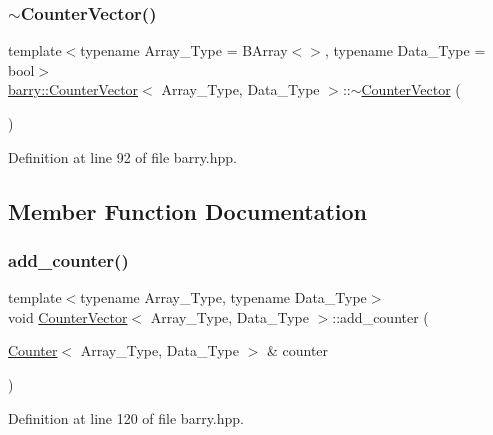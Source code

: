 \subsubsection{\texorpdfstring{$\sim$\+Counter\+Vector()}{~CounterVector()}}
{\footnotesize\ttfamily template$<$typename Array\+\_\+\+Type = B\+Array$<$$>$, typename Data\+\_\+\+Type = bool$>$ \\
\hyperlink{classbarry_1_1_counter_vector}{barry\+::\+Counter\+Vector}$<$ Array\+\_\+\+Type, Data\+\_\+\+Type $>$\+::$\sim$\hyperlink{classbarry_1_1_counter_vector}{Counter\+Vector} (\begin{DoxyParamCaption}{ }\end{DoxyParamCaption})\hspace{0.3cm}{\ttfamily [inline]}}



Definition at line 92 of file barry.\+hpp.



\subsection{Member Function Documentation}
\mbox{\label{classbarry_1_1_counter_vector_a34fda06ff678691daf3b0455c1a2af48}} 
\subsubsection{\texorpdfstring{add\+\_\+counter()}{add\_counter()}\hspace{0.1cm}{\footnotesize\ttfamily [1/3]}}
{\footnotesize\ttfamily template$<$typename Array\+\_\+\+Type, typename Data\+\_\+\+Type$>$ \\
void \hyperlink{classbarry_1_1_counter_vector}{Counter\+Vector}$<$ Array\+\_\+\+Type, Data\+\_\+\+Type $>$\+::add\+\_\+counter (\begin{DoxyParamCaption}\item[{\hyperlink{classbarry_1_1_counter}{Counter}$<$ Array\+\_\+\+Type, Data\+\_\+\+Type $>$ \&}]{counter }\end{DoxyParamCaption})\hspace{0.3cm}{\ttfamily [inline]}}



Definition at line 120 of file barry.\+hpp.

